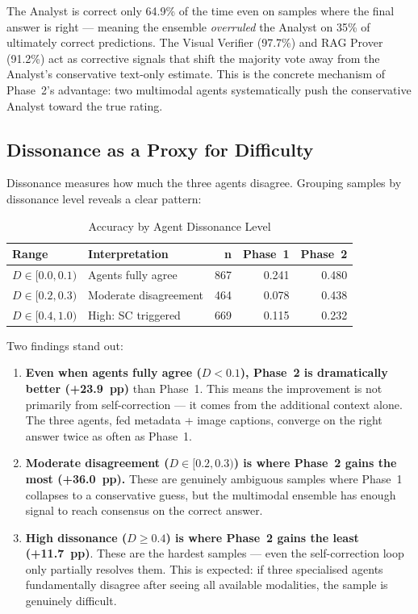 \documentclass[12pt,a4paper]{article}
\begin{document}
\noindent The Analyst is correct only 64.9\% of the time even on samples where the
final answer is right --- meaning the ensemble \emph{overruled} the Analyst on 35\% of
ultimately correct predictions. The Visual Verifier (97.7\%) and RAG Prover (91.2\%) act
as corrective signals that shift the majority vote away from the Analyst's conservative
text-only estimate. This is the concrete mechanism of Phase~2's advantage: two
multimodal agents systematically push the conservative Analyst toward the true rating.

\subsection{Dissonance as a Proxy for Difficulty}

Dissonance measures how much the three agents disagree. Grouping samples by dissonance
level reveals a clear pattern:

\begin{table}[H]
\centering
\caption{Accuracy by Agent Dissonance Level}
\begin{tabular}{llrrr}
\toprule
\textbf{Range} & \textbf{Interpretation} & \textbf{n} & \textbf{Phase~1} & \textbf{Phase~2} \\
\midrule
$D \in [0.0, 0.1)$ & Agents fully agree    & 867 & 0.241 & 0.480 \\
$D \in [0.2, 0.3)$ & Moderate disagreement & 464 & 0.078 & 0.438 \\
$D \in [0.4, 1.0)$ & High: SC triggered    & 669 & 0.115 & 0.232 \\
\bottomrule
\end{tabular}
\end{table}

\noindent Two findings stand out:

\begin{enumerate}[leftmargin=*]
  \item \textbf{Even when agents fully agree ($D < 0.1$), Phase~2 is dramatically better
    (+23.9~pp)} than Phase~1. This means the improvement is not primarily from
    self-correction --- it comes from the additional context alone. The three agents, fed
    metadata + image captions, converge on the right answer twice as often as Phase~1.

  \item \textbf{Moderate disagreement ($D \in [0.2, 0.3)$) is where Phase~2 gains the
    most (+36.0~pp).} These are genuinely ambiguous samples where Phase~1 collapses to
    a conservative guess, but the multimodal ensemble has enough signal to reach consensus
    on the correct answer.

  \item \textbf{High dissonance ($D \geq 0.4$) is where Phase~2 gains the least (+11.7~pp)}.
    These are the hardest samples --- even the self-correction loop only partially resolves
    them. This is expected: if three specialised agents fundamentally disagree after seeing
    all available modalities, the sample is genuinely difficult.
\end{enumerate}
\end{document}

